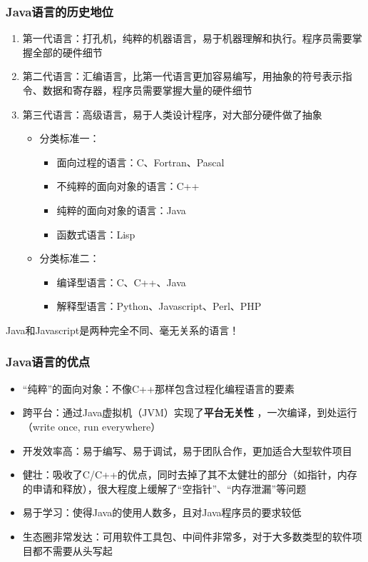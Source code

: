 \begin{frame}
  \frametitle{Java语言的历史地位}
  \begin{enumerate}
    \item 第一代语言：打孔机，纯粹的机器语言，易于机器理解和执行。程序员需要掌握全部的硬件细节
    \item 第二代语言：汇编语言，比第一代语言更加容易编写，用抽象的符号表示指令、数据和寄存器，程序员需要掌握大量的硬件细节
    \item 第三代语言：高级语言，易于人类设计程序，对大部分硬件做了抽象
      \begin{itemize}
        \item 分类标准一：
          \begin{itemize}
            \item 面向过程的语言：C、Fortran、Pascal
            \item 不纯粹的面向对象的语言：C++
            \item 纯粹的面向对象的语言：Java
            \item 函数式语言：Lisp
          \end{itemize}
        \item 分类标准二：
          \begin{itemize}
            \item 编译型语言：C、C++、Java
            \item 解释型语言：Python、Javascript、Perl、PHP
          \end{itemize}
      \end{itemize}
  \end{enumerate}
  
  Java和Javascript是两种完全不同、毫无关系的语言！

\end{frame}

\begin{frame}
  \frametitle{Java语言的优点}
  \begin{itemize}
    \item “纯粹”的面向对象：不像C++那样包含过程化编程语言的要素
    \item 跨平台：通过Java虚拟机（JVM）实现了\textbf{平台无关性} ，一次编译，到处运行（write once, run everywhere）
    \item 开发效率高：易于编写、易于调试，易于团队合作，更加适合大型软件项目
    \item 健壮：吸收了C/C++的优点，同时去掉了其不太健壮的部分（如指针，内存的申请和释放），很大程度上缓解了“空指针”、“内存泄漏”等问题
    \item 易于学习：使得Java的使用人数多，且对Java程序员的要求较低
    \item 生态圈非常发达：可用软件工具包、中间件非常多，对于大多数类型的软件项目都不需要从头写起
  \end{itemize}
\end{frame}

